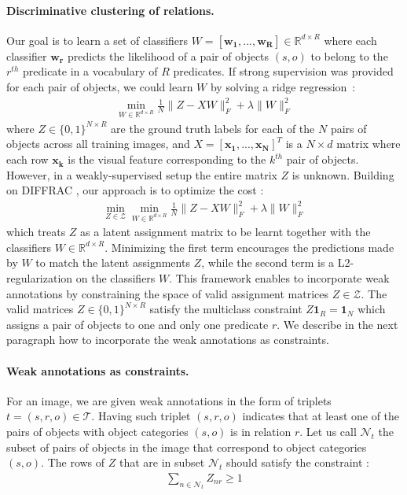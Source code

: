 \documentclass[10pt,twocolumn,letterpaper]{article}
\newcommand{\spaceparagraph}{\vspace{-.35cm}}
\begin{document}
\spaceparagraph
\paragraph{Discriminative clustering of relations.}
Our goal is to learn a set of classifiers $W = [\mathbf{w_1},...,\mathbf{w_R}] \in \mathbb{R}^{d \times R}$ where each classifier $\mathbf{w_r}$ predicts the likelihood of a pair of objects $(s,o)$ to belong to the $r^{th}$ predicate in a vocabulary of $R$ predicates. If strong supervision was provided for each pair of objects, we could learn $W$ by solving a ridge regression~:
\vspace{-0.5cm}
\begin{align}
\label{eq:ridgereg}
\min_{W \in \mathbb{R}^{d \times R}} \frac{1}{N} \|Z - XW \|^2_F + \lambda \|W\|^2_F
\end{align}
where $Z \in \{0,1\}^{N \times R}$ are the ground truth labels for each of the $N$ pairs of objects across all training images, and $X = [\mathbf{x_1}, ..., \mathbf{x_N}]^T$ is a $N \times d$ matrix where each row $\mathbf{x_k}$ is the visual feature corresponding to the $k^{th}$ pair of objects. However, in a weakly-supervised setup the entire matrix $Z$ is unknown. Building on DIFFRAC \cite{bach2008diffrac}, our approach is to optimize the cost : 
\vspace{-0.2cm}
\begin{align}
\label{DIFFRAC}
\min_{Z \in \mathcal{Z}} \min_{W \in \mathbb{R}^{d \times R}} \frac{1}{N} \|Z - XW \|^2_F + \lambda \|W\|^2_F
\end{align}
\noindent which treats $Z$ as a latent assignment matrix to be learnt together with the classifiers $W \in \mathbb{R}^{d \times R}$. Minimizing the first term encourages the predictions made by $W$ to match the latent assignments $Z$, while the second term is a L2-regularization on the classifiers $W$. This framework enables to incorporate weak annotations by constraining the space of valid assignment matrices $Z \in \mathcal{Z}$. The valid matrices $Z \in \{0,1\}^{N \times R}$ satisfy the multiclass constraint $Z \textbf{1}_R = \textbf{1}_N$ which assigns a pair of objects to one and only one predicate $r$. We describe in the next paragraph how to incorporate the weak annotations as constraints. 


\spaceparagraph
\paragraph{Weak annotations as constraints.} For an image, we are given weak annotations in the form of triplets $t = (s,r,o) \in \mathcal{T}$. Having such triplet $(s,r,o)$ indicates that at least one of the pairs of objects with object categories $(s,o)$ is in relation $r$. Let us call $\mathcal{N}_t$ the subset of pairs of objects in the image that correspond to object categories $(s,o)$. The rows of $Z$ that are in subset $\mathcal{N}_t$ should satisfy the constraint : 
\vspace{-0.2cm}
\begin{align}
\label{eq:multi_instance}
\sum_{n \in \mathcal{N}_t} Z_{nr} \ge 1
\end{align}
\vspace{-0.4cm}
\end{document}
